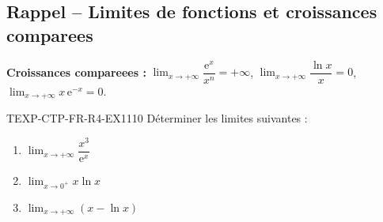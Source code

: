 

\subsection*{Rappel -- Limites de fonctions et croissances comparees}

\textbf{Croissances compareees :} $\lim_{x \to +\infty} \dfrac{\mathrm{e}^x}{x^n} = +\infty$, $\lim_{x \to +\infty} \dfrac{\ln x}{x} = 0$, $\lim_{x \to +\infty} x\,\mathrm{e}^{-x} = 0$.

\begin{exercice}{TEXP-CTP-FR-R4-EX1}{1}{10}
Déterminer les limites suivantes :
\begin{enumerate}
  \item $\lim_{x \to +\infty} \dfrac{x^3}{\mathrm{e}^x}$
  \item $\lim_{x \to 0^+} x \ln x$
  \item $\lim_{x \to +\infty} \left(x - \ln x\right)$
\end{enumerate}
\end{exercice}

